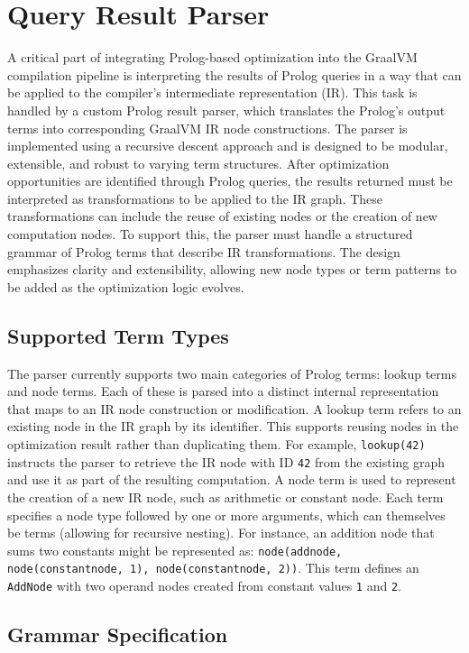 \section{Query Result Parser}
\label{sec:parser}
A critical part of integrating Prolog-based optimization into the GraalVM compilation pipeline is interpreting the results of Prolog queries in a way that can be applied to the compiler’s intermediate representation (IR). This task is handled by a custom Prolog result parser, which translates the Prolog’s output terms into corresponding GraalVM IR node constructions. The parser is implemented using a recursive descent approach and is designed to be modular, extensible, and robust to varying term structures. After optimization opportunities are identified through Prolog queries, the results returned must be interpreted as transformations to be applied to the IR graph. These transformations can include the reuse of existing nodes or the creation of new computation nodes. To support this, the parser must handle a structured grammar of Prolog terms that describe IR transformations. The design emphasizes clarity and extensibility, allowing new node types or term patterns to be added as the optimization logic evolves.

\subsection{Supported Term Types}

The parser currently supports two main categories of Prolog terms: lookup terms and node terms.
Each of these is parsed into a distinct internal representation that maps to an IR node construction or modification.
A lookup term refers to an existing node in the IR graph by its identifier. This supports reusing nodes in the optimization result rather than duplicating them. For example, \texttt{lookup(42)} instructs the parser to retrieve the IR node with ID \texttt{42} from the existing graph and use it as part of the resulting computation.
A node term is used to represent the creation of a new IR node, such as arithmetic or constant node. Each term specifies a node type followed by one or more arguments, which can themselves be terms (allowing for recursive nesting). For instance, an addition node that sums two constants might be represented as: \texttt{node(addnode, node(constantnode, 1), node(constantnode, 2))}. This term defines an \texttt{AddNode} with two operand nodes created from constant values \texttt{1} and \texttt{2}.

\subsection{Grammar Specification}

